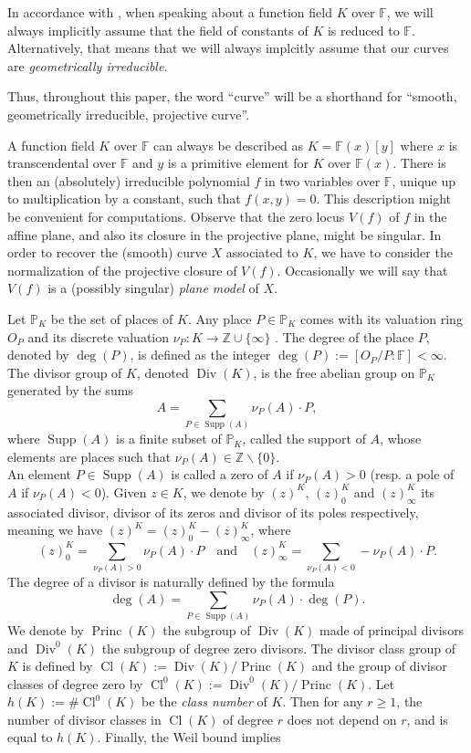 \documentclass[10pt]{article}
\theoremstyle{definition}
\theoremstyle{definition}
\theoremstyle{definition}
\newcommand{\cd}{\cdot}
\newcommand{\Z}{\mathbb{Z}}
\newcommand{\F}{\mathbb{F}}
\newcommand{\PP}{\mathbb{P}}
\newcommand{\Div}{\operatorname{Div}}
\newcommand{\Princ}{\operatorname{Princ}}
\newcommand{\Cl}{\operatorname{Cl}}
\newcommand{\Supp}{\operatorname{Supp}}
\begin{document}
In accordance with \cite[sec.~1.4~ff.]{Sti}, when speaking about a function field $K$ over $\F$, we will always implicitly assume that the field of constants of $K$ is reduced to $\F$. Alternatively, that means that we will always implcitly assume that our curves are \emph{geometrically irreducible}.

Thus, throughout this paper, the word ``curve'' will be a shorthand for ``smooth, geometrically irreducible, projective curve''. 

 A function field $K$ over $\F$ can always be described as $K=\F(x)[y]$ where $x$ is transcendental over $\F$ and $y$ is a primitive element for $K$ over $\F(x)$.
There is then an (absolutely) irreducible polynomial $f$ in two variables over $\F$, unique up to multiplication by a constant, such that $f(x,y)=0$. This description might be convenient for computations.
Observe that the zero locus $V(f)$ of $f$ in the affine plane, and also its closure in the projective plane, might be singular.
In order to recover the (smooth) curve $X$ associated to $K$, we have to consider the normalization of the projective closure of $V(f)$.
Occasionally we will say that $V(f)$ is a (possibly singular) \emph{plane model} of $X$.



 Let $\PP_K$ be the set of places of $K$. Any place $P \in \PP_K$ comes with its valuation ring $O_P$ and its discrete valuation $\nu_P : K \rightarrow \Z \cup \{\infty\}$ . The degree of the place $P$, denoted by $\deg(P)$, is defined as the  integer $\deg(P) :=  [O_P/P:\F] < \infty$.
The divisor group of $K$, denoted $\Div(K)$, is the free abelian group on $\mathbb{P}_K$ generated by the sums
\[A = \sum\limits_{P \in \Supp(A)} \nu_P(A) \cd P,\]
where $\Supp(A)$ is a finite subset of $\PP_K$, called the support of $A$, whose elements are places such that $\nu_{P}(A) \in \Z \backslash \{0\}$. \\ 
An element $P \in \Supp(A)$ is called a zero of $A$ if $\nu_P(A) >0$ (resp. a pole of $A$ if $\nu_P(A) < 0$). Given $z \in K$, we denote by $(z)^K$, $(z)^K_0$ and $(z)^K_{\infty}$ its associated divisor, divisor of its zeros and divisor of its poles respectively, meaning we have $(z)^K = (z)^K_0 - (z)^K_{\infty}$, where 
\[(z)^K_0 = \sum\limits_{\nu_P(A) > 0}\nu_P(A) \cd P \quad \textrm{and}  \quad (z)^K_{\infty} = \sum\limits_{\nu_P(A) < 0}-\nu_P(A) \cd P.\]
The degree of a divisor is naturally defined by the formula
\[\deg(A) = \sum\limits_{P \in \Supp(A)} \nu_P(A) \cd \deg( P).\]
We denote by $\Princ(K)$ the subgroup of $\Div(K)$ made of principal divisors and $\Div^0(K)$ the subgroup of degree zero divisors. The divisor class group of $K$ is defined by $\Cl(K):=\Div(K)/\Princ(K)$ and the group of divisor classes of degree zero by $\Cl^0(K):=\Div^0(K)/\Princ(K)$. 
Let $h(K):= \# \Cl^0(K)$ be the \emph{class number} of $K$. Then for any $r \geq 1$, the number of divisor classes in $\Cl(K)$ of degree $r$ does not depend on $r$, and is equal to $h(K)$. Finally, the Weil bound implies
\end{document}
